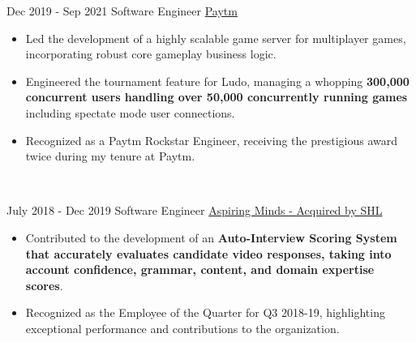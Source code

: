 \documentclass[letterpaper]{twentysecondcv} %
\begin{document}
\begin{fullwidth}
\begin{twenty}
     \twentyitem
   		{Dec 2019 -}
		{Sep 2021}
        {Software Engineer}
        {\href{https://paytm.com/}{Paytm}}
        {}
        {\begin{itemize}
        \item Led the development of a highly scalable game server for multiplayer games, incorporating robust core gameplay business logic.
        \item Engineered the tournament feature for Ludo, managing a whopping \textbf{300,000 concurrent users handling over 50,000 concurrently running games} including spectate mode user connections.
        \item Recognized as a Paytm Rockstar Engineer, receiving the prestigious award twice during my tenure at Paytm.
        \end{itemize}}
    \\
\end{twenty}
\begin{twenty}
     \twentyitem
   		{July 2018 -}
		{Dec 2019}
        {Software Engineer}
        {\href{https://www.shl.com/en-in/}{Aspiring Minds - Acquired by SHL}}
        {}
        {\begin{itemize}
        \item Contributed to the development of an \textbf{Auto-Interview Scoring System that accurately evaluates candidate video responses, taking into account confidence, grammar, content, and domain expertise scores}.
        \item Recognized as the Employee of the Quarter for Q3 2018-19, highlighting exceptional performance and contributions to the organization.
        \end{itemize}}
    \\
\end{twenty}


\end{fullwidth}
\end{document}
